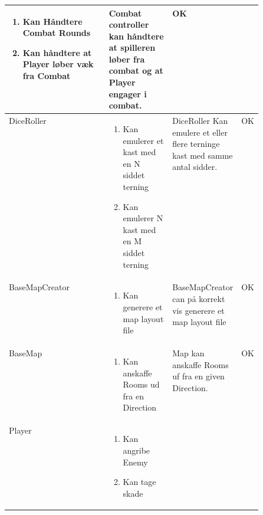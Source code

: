 \begin{center}
\begin{longtable}{|l|p{0.25\linewidth}|p{0.25\linewidth}|l|}
\begin{enumerate}
    \item \begin{flushleft} Kan Håndtere Combat Rounds \end{flushleft}
    \item \begin{flushleft} Kan håndtere at Player løber væk fra Combat \end{flushleft}
  \end{enumerate}
  &
  \flushleft
  Combat controller kan håndtere at spilleren løber fra combat og at Player engager i combat.
  &
  OK
  \\ \hline
  DiceRoller
  &
  \begin{enumerate}
    \item \begin{flushleft} Kan emulerer et kast med en N siddet terning \end{flushleft}
    \item \begin{flushleft} Kan emulerer N kast med en M siddet terning \end{flushleft}
  \end{enumerate}
  &
  \flushleft
  DiceRoller Kan emulere et eller flere terninge kast med samme antal sidder.
  &
  OK
  \\ \hline
  BaseMapCreator
  &
  \begin{enumerate}
    \item \begin{flushleft} Kan generere et map layout file \end{flushleft}
  \end{enumerate}
  &
  \flushleft
  BaseMapCreator can på korrekt vis generere et map layout file
  &
  OK
  \\ \hline
  BaseMap
  &
  \begin{enumerate}
    \item \begin{flushleft} Kan anskaffe Rooms ud fra en Direction \end{flushleft}
  \end{enumerate}
  &
  \flushleft
  Map kan anskaffe Rooms uf fra en given Direction.
  &
  OK
  \\ \hline
  Player
  &
  \begin{enumerate}
    \item \begin{flushleft} Kan angribe Enemy  \end{flushleft}
    \item \begin{flushleft} Kan tage skade \end{flushleft}

\end{enumerate}
\end{longtable}
\end{center}
